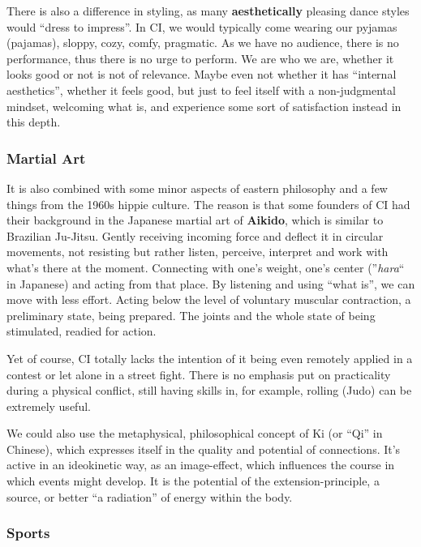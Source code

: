 There is also a difference in styling, as many \textbf{aesthetically} pleasing dance styles would ``dress to impress''.
In CI, we would typically come wearing our pyjamas (pajamas), sloppy, cozy, comfy, pragmatic.
As we have no audience, there is no performance, thus there is no urge to perform.
We are who we are, whether it looks good or not is not of relevance.
Maybe even not whether it has ``internal aesthetics'', whether it feels good, but just to feel itself with a non-judgmental mindset, welcoming what is, and experience some sort of satisfaction instead in this depth.

\subsubsection{Martial Art}\label{subsec:martial-art}

It is also combined with some minor aspects of eastern philosophy and a few things from the 1960s hippie culture.
The reason is that some founders of CI had their background in the Japanese martial art of \textbf{Aikido}, which is similar to Brazilian Ju-Jitsu.
Gently receiving incoming force and deflect it in circular movements, not resisting but rather listen, perceive, interpret and work with what's there at the moment.
Connecting with one's weight, one's center (''\textit{hara}`` in Japanese) and acting from that place.
By listening and using ``what is'', we can move with less effort.
Acting below the level of voluntary muscular contraction, a preliminary state, being prepared.
The joints and the whole state of being stimulated, readied for action.

Yet of course, CI totally lacks the intention of it being even remotely applied in a contest or let alone in a street fight.
There is no emphasis put on practicality during a physical conflict, still having skills in, for example, rolling (Judo) can be extremely useful.

We could also use the metaphysical, philosophical concept of Ki (or ``Qi'' in Chinese), which expresses itself in the quality and potential of connections.
It's active in an ideokinetic way, as an image-effect, which influences the course in which events might develop.
It is the potential of the extension-principle, a source, or better ``a radiation'' of energy within the body.

\subsubsection{Sports}\label{subsec:sports}

